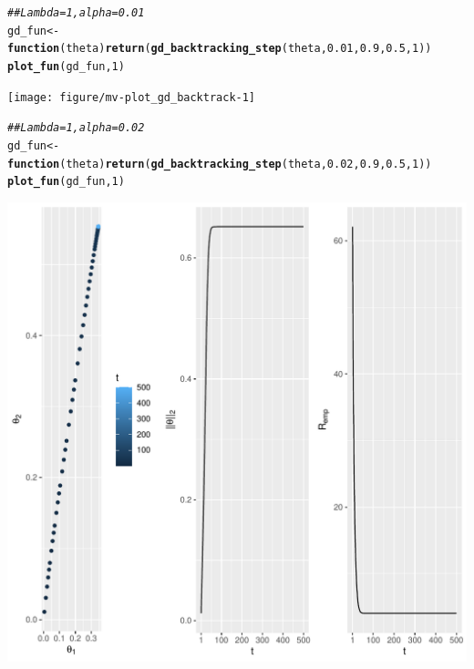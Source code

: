 \documentclass[a4paper]{article}
\makeatletter
\newcommand{\hlnum}[1]{\textcolor[rgb]{0.686,0.059,0.569}{#1}}%
\newcommand{\hlcom}[1]{\textcolor[rgb]{0.678,0.584,0.686}{\textit{#1}}}%
\newcommand{\hlstd}[1]{\textcolor[rgb]{0.345,0.345,0.345}{#1}}%
\newcommand{\hlkwa}[1]{\textcolor[rgb]{0.161,0.373,0.58}{\textbf{#1}}}%
\newcommand{\hlkwb}[1]{\textcolor[rgb]{0.69,0.353,0.396}{#1}}%
\newcommand{\hlkwc}[1]{\textcolor[rgb]{0.333,0.667,0.333}{#1}}%
\newcommand{\hlkwd}[1]{\textcolor[rgb]{0.737,0.353,0.396}{\textbf{#1}}}%
\newenvironment{kframe}{%
 \def\at@end@of@kframe{}%
 \ifinner\ifhmode%
  \def\at@end@of@kframe{\end{minipage}}%
  \begin{minipage}{\columnwidth}%
 \fi\fi%
 \def\FrameCommand##1{\hskip\@totalleftmargin \hskip-\fboxsep
 \colorbox{shadecolor}{##1}\hskip-\fboxsep
     \hskip-\linewidth \hskip-\@totalleftmargin \hskip\columnwidth}%
 \MakeFramed {\advance\hsize-\width
   \@totalleftmargin\z@ \linewidth\hsize
   \@setminipage}}%
 {\par\unskip\endMakeFramed%
 \at@end@of@kframe}
\newenvironment{knitrout}{}{} %
\makeatother
\begin{document}
{\begin{enumerate}
\begin{knitrout}
\begin{kframe}
\begin{alltt}
\hlcom{## Lambda = 1, alpha = 0.01}
\hlstd{gd_fun} \hlkwb{<-} \hlkwa{function}\hlstd{(}\hlkwc{theta}\hlstd{)} \hlkwd{return}\hlstd{(}\hlkwd{gd_backtracking_step}\hlstd{(theta,} \hlnum{0.01}\hlstd{,} \hlnum{0.9}\hlstd{,} \hlnum{0.5}\hlstd{,} \hlnum{1}\hlstd{))}
\hlkwd{plot_fun}\hlstd{(gd_fun,} \hlnum{1}\hlstd{)}
\end{alltt}
\end{kframe}
\texttt{[image: figure/mv-plot\_gd\_backtrack-1]} 
\begin{kframe}\begin{alltt}
\hlcom{## Lambda = 1, alpha = 0.02}
\hlstd{gd_fun} \hlkwb{<-} \hlkwa{function}\hlstd{(}\hlkwc{theta}\hlstd{)} \hlkwd{return}\hlstd{(}\hlkwd{gd_backtracking_step}\hlstd{(theta,} \hlnum{0.02}\hlstd{,} \hlnum{0.9}\hlstd{,} \hlnum{0.5}\hlstd{,} \hlnum{1}\hlstd{))}
\hlkwd{plot_fun}\hlstd{(gd_fun,} \hlnum{1}\hlstd{)}
\end{alltt}
\end{kframe}
\includegraphics[width=0.5\linewidth]{figure/mv-plot_gd_backtrack-2} 
\end{knitrout}
\end{enumerate}
}
\end{document}
